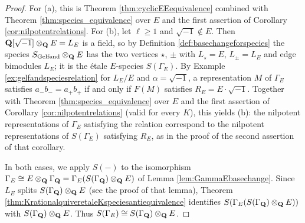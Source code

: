 \documentclass[a4paper,12pt,reqno]{amsart}
\newcommand{\QQ}{{\rm\bf Q}}
\theoremstyle{plain}
\theoremstyle{remark}
\begin{document}
    \begin{proof}
      For (a), this is Theorem \ref{thm:cyclicEEequivalence} combined with Theorem \ref{thm:species_equivalence} over $E$ and the first assertion of Corollary \ref{cor:nilpotentrelations}.
      For (b), let $\ell\geq1$ and $\sqrt{-1}\not\in E$. Then $\QQ[\sqrt{-1}]\otimes_\QQ E=L_E$ is a field, so by Definition \ref{def:basechangeforspecies} the species $S_{\rm Gelfand}\otimes_\QQ E$ has the two vertices $\star$, $\pm$ with $L_\star=E$, $L_\pm=L_E$ and edge bimodules $L_E$; it is the \'etale $E$-species $S(\Gamma_E)$. By Example \ref{ex:gelfandspeciesrelation} for $L_E/E$ and $\alpha=\sqrt{-1}$, a representation $M$ of $\Gamma_E$ satisfies $a_-b_-=a_+b_+$ if and only if $F(M)$ satisfies $R_E=E\cdot\sqrt{-1}$. Together with Theorem \ref{thm:species_equivalence} over $E$ and the first assertion of Corollary \ref{cor:nilpotentrelations} (valid for every $K$), this yields (b): the nilpotent representations of $\Gamma_E$ satisfying the relation correspond to the nilpotent representations of $S(\Gamma_E)$ satisfying $R_E$, as in the proof of the second assertion of that corollary.

      In both cases, we apply $S(-)$ to the isomorphism $\Gamma_E\cong E\otimes_\QQ\Gamma_\QQ=\Gamma_E(S(\Gamma_\QQ)\otimes_\QQ E)$ of Lemma \ref{lem:GammaEbasechange}. Since $L_E$ splits $S(\Gamma_\QQ)\otimes_\QQ E$ (see the proof of that lemma), Theorem \ref{thm:KrationalquiveretaleKspeciesantiequivalence} identifies $S(\Gamma_E(S(\Gamma_\QQ)\otimes_\QQ E))$ with $S(\Gamma_\QQ)\otimes_\QQ E$. Thus $S(\Gamma_E)\cong S(\Gamma_\QQ)\otimes_\QQ E$.


\end{proof}
\end{document}

